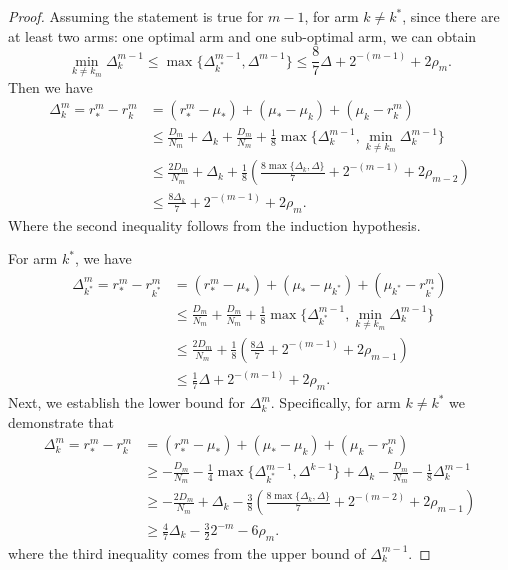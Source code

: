 \begin{proof}
    Assuming the statement is true for $m-1$, for arm $k \neq k^*$, since there are at least two arms: one optimal arm and one sub-optimal arm, we can obtain
    \[\min_{k \neq k_m}\Delta_k^{m-1} \leq \max\{\Delta_{k^*}^{m-1}, \Delta^{m-1}\} \leq \frac{8}{7}\Delta + 2^{-(m-1)} + 2\rho_m.\]    
    Then we have
    \begin{equation*}
    \begin{split}
        \Delta_k^m = r_*^m - r_k^m
        &= (r_*^m - \mu_*) + (\mu_* - \mu_k) + (\mu_k - r_k^m) \\
        &\leq \frac{D_m}{N_m}+ \Delta_k + \frac{D_m}{N_m} + \frac{1}{8}\max \{\Delta_k^{m-1}, \min_{k \neq k_m}\Delta_k^{m-1}\} \\
        &\leq \frac{2D_m}{N_m} + \Delta_k + \frac{1}{8}\left(\frac{8 \max\{\Delta_k, \Delta\}}{7} + 2^{-(m-1)} + 2\rho_{m-2}\right) \\
        &\leq \frac{8\Delta_k}{7} + 2^{-(m-1)} + 2\rho_m.
    \end{split}
    \end{equation*}
    Where the second inequality follows from the induction hypothesis.

    For arm $k^*$, we have
    \begin{equation*}
    \begin{split}
        \Delta_{k^*}^m = r_*^m - r_{k^*}^m
        &= (r_*^m - \mu_*) + (\mu_* - \mu_{k^*}) + (\mu_{k^*} - r_{k^*}^m) \\
        &\leq \frac{D_m}{N_m} + \frac{D_m}{N_m} + \frac{1}{8} \max \{\Delta_{k^*}^{m-1}, \min_{k \neq k_m}\Delta_{k}^{m-1}\} \\
        &\leq \frac{2D_m}{N_m} + \frac{1}{8}\left(\frac{8 \Delta}{7} + 2^{-(m-1)} + 2\rho_{m-1}\right) \\
        &\leq \frac{1}{7}\Delta + 2^{-(m-1)} + 2\rho_m.
    \end{split}
    \end{equation*}
    Next, we establish the lower bound for $\Delta_k^m$. Specifically, for arm $k \neq k^*$ we demonstrate that
    \begin{equation*}
    \begin{split}
        \Delta_k^m =  r_*^m - r_k^m
        &= (r_*^m - \mu_*) + (\mu_* - \mu_k) + (\mu_k - r_k^m) \\
        &\geq -\frac{D_m}{N_m} - \frac{1}{4}\max \{\Delta_{k^*}^{m-1}, \Delta^{k-1}\} + \Delta_k -\frac{D_m}{N_m} - \frac{1}{8}\Delta_k^{m-1} \\
        &\geq -\frac{2D_m}{N_m} + \Delta_k - \frac{3}{8}(\frac{8 \max\{\Delta_k, \Delta\}}{7} + 2^{-(m-2)} + 2\rho_{m-1}) \\
        &\geq \frac{4}{7}\Delta_k - \frac{3}{2}2^{-m} - 6\rho_m.
    \end{split}
    \end{equation*}
    where the third inequality comes from the upper bound of $\Delta_k^{m-1}$.


\end{proof}
